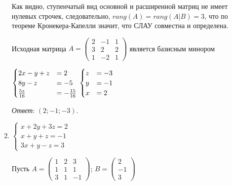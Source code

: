 \begin{enumerate}
    Как видно, ступенчатый вид основной и расширенной матриц не имеет нулевых строчек,
    следовательно, $rang(A) = rang(A|B) = 3$, что по теореме Кронекера-Капелли значит, что СЛАУ совместна и определена.

    Исходная матрица $A = \begin{pmatrix}2 & -1 & 1\\ 3 & 2 & 2 \\ 1 & -2 & 1\end{pmatrix}$ является базисным минором

    $\displaystyle \begin{cases}
         2x - y + z &= 2 \\
             8y - z &= -5 \\
      \frac{5z}{16} &= -\frac{15}{16}
    \end{cases}\\
    \begin{cases}
        z &= -3 \\
        y &= -1 \\
        x &= 2
    \end{cases}$

    \textit{Ответ}: $(2; -1; -3)$.
    \vspace{10mm}

    \item $\begin{cases}
              x + 2y + 3z = 2 \\
              x + y + z = -1 \\
              3x + y - z = 3
    \end{cases}$

    Пусть $A = \begin{pmatrix}1 & 2 & 3\\ 1 & 1 & 1 \\ 3 & 1 & -1\end{pmatrix}$; $B = \begin{pmatrix}2 \\ -1 \\ 3\end{pmatrix}$


\end{enumerate}
